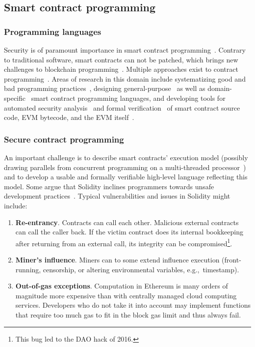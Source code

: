 \subsection{Smart contract programming}

\subsubsection{Programming languages}
Security is of paramount importance in smart contract programming~\cite{Atzei2017, Delmolino2016}.
Contrary to traditional software, smart contracts can not be patched, which brings new challenges to blockchain programming~\cite{Porru2017}.
Multiple approaches exist to contract programming~\cite{Seijas2016}.
Areas of research in this domain include systematizing good and bad programming practices~\cite{ConsenSys16, Chen2017}, designing general-purpose~\cite{Hirai2017a, Buterin2017b, Pettersson2016} as well as domain-specific~\cite{Biryukov2017, EgelundMueller2017} smart contract programming languages, and developing tools for automated security analysis~\cite{Luu2016a, Tsankov2018} and formal verification~\cite{Bhargavan2016} of smart contract source code, EVM bytecode, and the EVM itself~\cite{Hirai2017}.

\subsubsection{Secure contract programming}

An important challenge is to describe smart contracts' execution model (possibly drawing parallels from concurrent programming on a multi-threaded processor~\cite{Sergey2017}) and to develop a usable and formally verifiable high-level language reflecting this model.
Some argue that Solidity inclines programmers towards unsafe development practices~\cite{ydtm2016}.
Typical vulnerabilities and issues in Solidity might include:
\begin{enumerate}
	\item \textbf{Re-entrancy}. Contracts can call each other. Malicious external contracts can call the caller back. If the victim contract does its internal bookkeeping after returning from an external call, its integrity can be compromised\footnote{This bug led to the DAO hack of 2016.}.
	\item \textbf{Miner's influence}. Miners can to some extend influence execution (front-running, censorship, or altering environmental variables, e.g.,~timestamp).
	\item \textbf{Out-of-gas exceptions}. Computation in Ethereum is many orders of magnitude more expensive than with centrally managed cloud computing services. Developers who do not take it into account may implement functions that require too much gas to fit in the block gas limit and thus always fail.
\end{enumerate}

